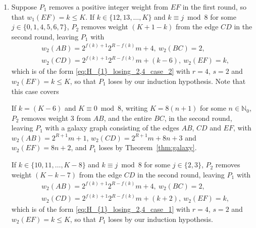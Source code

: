 \documentclass[11pt,reqno]{amsart}
\theoremstyle{definition}
\theoremstyle{definition}
\begin{document}
\begin{enumerate}
\item Suppose $P_{1}$ removes a positive integer weight from $EF$ in the first round, so that $w_{1}(EF)=k \leqslant K$. If $k \in \{12,13,\ldots,K\}$ and $k \equiv j \bmod 8$ for some $j \in \{0,1,4,5,6,7\}$, $P_{2}$ removes weight $(K+1-k)$ from the edge $CD$ in the second round, leaving $P_{1}$ with
\begin{align}
{}&w_{2}(AB)=2^{f(k)+1}2^{R-f(k)}m+4,\ w_{2}(BC)=2,\nonumber\\
{}&w_{2}(CD)=2^{f(k)+1}2^{R-f(k)}m+(k-6),\ w_{2}(EF)=k,\nonumber
\end{align}
which is of the form \eqref{eq:H_{1}_losing_2,4_case_2} with $r=4$, $s=2$ and $w_{2}(EF)=k \leqslant K$, so that $P_{1}$ loses by our induction hypothesis. Note that this case covers
If $k=(K-6)$ and $K \equiv 0 \bmod 8$, writing $K=8(n+1)$ for some $n\in\mathbb{N}_{0}$, $P_{2}$ removes weight $3$ from $AB$, and the entire $BC$, in the second round, leaving $P_{1}$ with a galaxy graph consisting of the edges $AB$, $CD$ and $EF$, with $w_{2}(AB)=2^{R+1}m+1$, $w_{2}(CD)=2^{R+1}m+8n+3$ and $w_{2}(EF)=8n+2$, and $P_{1}$ loses by Theorem~\ref{thm:galaxy}.

If $k\in\{10,11,\ldots,K-8\}$ and $k \equiv j \bmod 8$ for some $j \in \{2,3\}$, $P_{2}$ removes weight $(K-k-7)$ from the edge $CD$ in the second round, leaving $P_{1}$ with 
\begin{align}
{}&w_{2}(AB)=2^{f(k)+1}2^{R-f(k)}m+4,\ w_{2}(BC)=2,\nonumber\\
{}&w_{2}(CD)=2^{f(k)+1}2^{R-f(k)}m+(k+2),\ w_{2}(EF)=k,\nonumber
\end{align}
which is of the form \eqref{eq:H_{1}_losing_2,4_case_1} with $r=4$, $s=2$ and $w_{2}(EF)=k \leqslant K$, so that $P_{1}$ loses by our induction hypothesis. 


\end{enumerate}
\end{document}
